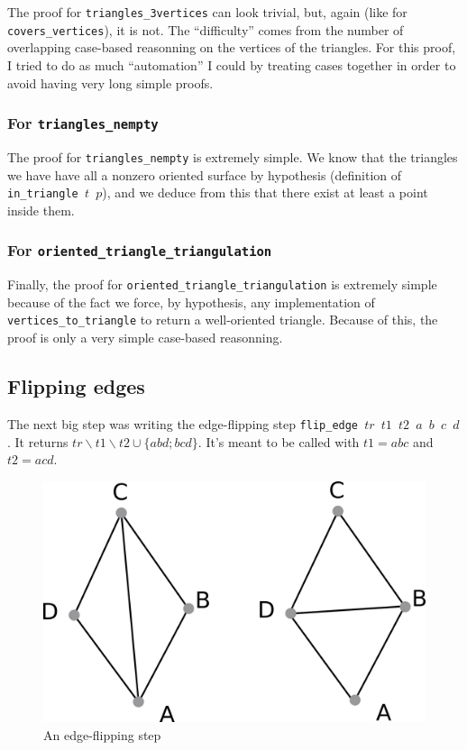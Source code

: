 \documentclass[a4paper,10pt]{article}
\begin{document}
  The proof for {\tt triangles\_3vertices} can look trivial, but, again (like for {\tt covers\_vertices}), it is not. The ``difficulty'' comes from the number of overlapping case-based reasonning on the vertices of the triangles. For this proof, I tried to do as much ``automation'' I could by treating cases together in order to avoid having very long simple proofs.
  
  \subsubsection{For {\tt triangles\_nempty}}

  The proof for {\tt triangles\_nempty} is extremely simple. We know that the triangles we have have all a nonzero oriented surface by hypothesis (definition of {\tt in\_triangle $t$ $p$}), and we deduce from this that there exist at least a point inside them.

  \subsubsection{For {\tt oriented\_triangle\_triangulation}}
  \label{oriented_simple}
  Finally, the proof for {\tt oriented\_triangle\_triangulation} is extremely simple because of the fact we force, by hypothesis, any implementation of {\tt vertices\_to\_triangle} to return a well-oriented triangle. Because of this, the proof is only a very simple case-based reasonning.

  
\subsection{Flipping edges}
The next big step was writing the edge-flipping step {\tt flip\_edge $tr$ $t1$ $t2$ $a$ $b$ $c$ $d$}.
It returns $tr \smallsetminus t1 \smallsetminus t2 \cup \{abd;bcd\}$. It's meant to be called with $t1 = abc$ and $t2=acd$.

\begin{figure}[h]
  \centering
  \caption{\label{flip_edge} An edge-flipping step}
  \includegraphics[scale=2]{flip_edge}
\end{figure}
\end{document}

